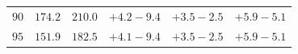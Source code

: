 \begin{table}[p]
\begin{center}
\begin{tabular}{cccccc}
$ 90 $&$ 174.2   $&$ 210.0  $&$  +4.2  -\!9.4 $&$ +3.5  -\!2.5 $&$  +5.9  -\!5.1 $\\
$ 95 $&$ 151.9   $&$ 182.5 $&$  +4.1  -\!9.4 $&$ +3.5  -\!2.5 $&$  +5.9  -\!5.1 $\\

\end{tabular}
\end{center}
\end{table}
